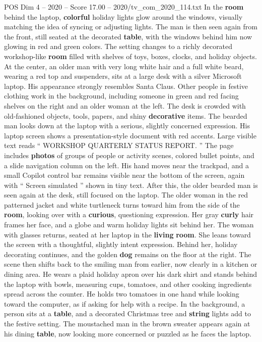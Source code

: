 \begin{textsample}{POS Dim 4 – 2020 – Score 17.00 – 2020/tv\_com\_2020\_114.txt}
In the \textbf{room} behind the laptop, \textbf{colorful} holiday lights glow around the windows, visually matching the idea of syncing or adjusting lights.
The man is then seen again from the front, still seated at the decorated \textbf{table}, with the windows behind him now glowing in red and green colors.
The setting changes to a richly decorated workshop-like \textbf{room} filled with shelves of toys, boxes, clocks, and holiday objects.
At the center, an older man with very long white hair and a full white beard, wearing a red top and suspenders, sits at a large desk with a silver Microsoft laptop.
His appearance strongly resembles Santa Claus.
Other people in festive clothing work in the background, including someone in green and red facing shelves on the right and an older woman at the left.
The desk is crowded with old-fashioned objects, tools, papers, and shiny \textbf{decorative} items.
The bearded man looks down at the laptop with a serious, slightly concerned expression.
His laptop screen shows a presentation-style document with red accents.
Large visible text reads “ WORKSHOP QUARTERLY STATUS REPORT. ” The page includes \textbf{photos} of groups of people or activity scenes, colored bullet points, and a slide navigation column on the left.
His hand moves near the trackpad, and a small Copilot control bar remains visible near the bottom of the screen, again with “ Screen simulated ” shown in tiny text.
After this, the older bearded man is seen again at the desk, still focused on the laptop.
The older woman in the red patterned jacket and white turtleneck turns toward him from the side of the \textbf{room}, looking over with a \textbf{curious}, questioning expression.
Her gray \textbf{curly} hair frames her face, and a globe and warm holiday lights sit behind her.
The woman with glasses returns, seated at her laptop in the \textbf{living} \textbf{room}.
She leans toward the screen with a thoughtful, slightly intent expression.
Behind her, holiday decorating continues, and the golden \textbf{dog} remains on the floor at the right.
The scene then shifts back to the smiling man from earlier, now clearly in a kitchen or dining area.
He wears a plaid holiday apron over his dark shirt and stands behind the laptop with bowls, measuring cups, tomatoes, and other cooking ingredients spread across the counter.
He holds two tomatoes in one hand while looking toward the computer, as if asking for help with a recipe.
In the background, a person sits at a \textbf{table}, and a decorated Christmas tree and \textbf{string} lights add to the festive setting.
The moustached man in the brown sweater appears again at his dining \textbf{table}, now looking more concerned or puzzled as he faces the laptop.

\end{textsample}
